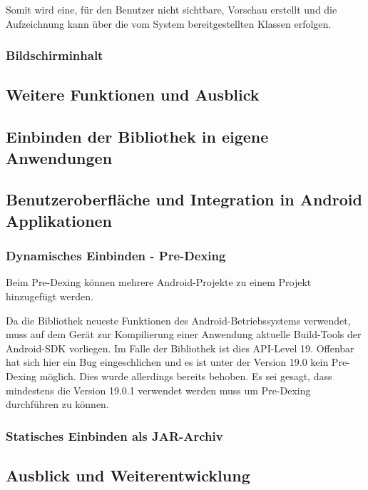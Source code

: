 Somit wird eine, für den Benutzer nicht sichtbare, Vorschau erstellt und die Aufzeichnung kann über die vom System bereitgestellten Klassen erfolgen.


\subsubsection{Bildschirminhalt}


\subsection{Weitere Funktionen und Ausblick}

\subsection{Einbinden der Bibliothek in eigene Anwendungen}


\subsection{Benutzeroberfläche und Integration in Android Applikationen}


\subsubsection{Dynamisches Einbinden - Pre-Dexing}

Beim Pre-Dexing können mehrere Android-Projekte zu einem Projekt hinzugefügt werden. 

Da die Bibliothek neueste Funktionen des Android-Betriebssystems verwendet, muss auf dem  Gerät zur Kompilierung einer Anwendung aktuelle Build-Tools der Android-SDK vorliegen.
Im Falle der Bibliothek ist dies API-Level 19. Offenbar hat sich hier ein Bug eingeschlichen und es ist unter der Version 19.0 kein Pre-Dexing möglich.
Dies wurde allerdings bereits behoben. Es sei gesagt, dass mindestens die Version 19.0.1 verwendet werden muss um Pre-Dexing durchführen zu können.

\subsubsection{Statisches Einbinden als JAR-Archiv}

\subsection{Ausblick und Weiterentwicklung}
